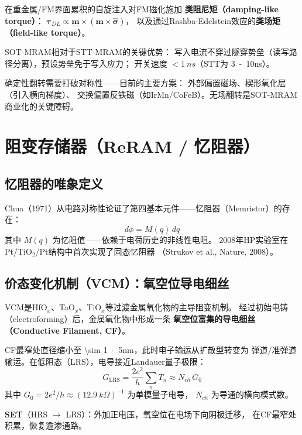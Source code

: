 \documentclass[11pt,a4paper,twoside]{article}
\theoremstyle{definition}\newtheorem{definition}{定义}[section]
\theoremstyle{plain}\newtheorem{theorem}{定理}[section]
\theoremstyle{remark}\newtheorem{remark}{注解}[section]
\begin{document}
在重金属/FM界面累积的自旋注入对FM磁化施加
\textbf{类阻尼矩（damping-like torque）}：
$\boldsymbol{\tau}_{DL} \propto \mathbf{m} \times (\mathbf{m} \times \hat{\boldsymbol{\sigma}})$，
以及通过Rashba-Edelstein效应的\textbf{类场矩（field-like torque）}。

SOT-MRAM相对于STT-MRAM的关键优势：
写入电流不穿过隧穿势垒（读写路径分离），预设势垒免于写入应力；
开关速度 $< \SI{1}{ns}$（STT为 \SI{3}{-10}{ns}）。

确定性翻转需要打破对称性——目前的主要方案：
外部偏置磁场、楔形氧化层（引入横向梯度）、
交换偏置反铁磁（如IrMn/CoFeB）。无场翻转是SOT-MRAM商业化的关键障碍。

\section{阻变存储器（ReRAM / 忆阻器）}
\label{sec:reram}

\subsection{忆阻器的唯象定义}

Chua（1971）从电路对称性论证了第四基本元件——忆阻器（Memristor）的存在：
\begin{equation}
  d\phi = M(q)\, dq
\end{equation}
其中 $M(q)$ 为忆阻值——依赖于电荷历史的非线性电阻。
2008年HP实验室在Pt/TiO$_2$/Pt结构中首次实现了固态忆阻器
（Strukov et al., Nature, 2008）。

\subsection{价态变化机制（VCM）：氧空位导电细丝}

VCM是HfO$_x$、TaO$_x$、TiO$_x$等过渡金属氧化物的主导阻变机制。
经过初始电铸（electroforming）后，金属氧化物中形成一条
\textbf{氧空位富集的导电细丝（Conductive Filament, CF）}。

CF最窄处直径缩小至 \SI{\sim 1}{-5}{nm}，此时电子输运从扩散型转变为
弹道/准弹道输运。在低阻态（LRS），电导接近Landauer量子极限：
\begin{equation}\label{eq:landauer}
  G_{\text{LRS}} = \frac{2e^2}{h} \sum_n T_n
                 \approx N_{ch}\, G_0
\end{equation}
其中 $G_0 = 2e^2/h \approx (12.9\ \si{k\Omega})^{-1}$ 为单模量子电导，
$N_{ch}$ 为导通的横向模式数。

\textbf{SET}（HRS $\to$ LRS）：外加正电压，氧空位在电场下向阴极迁移，
在CF最窄处积累，恢复逾渗通路。
\end{document}
